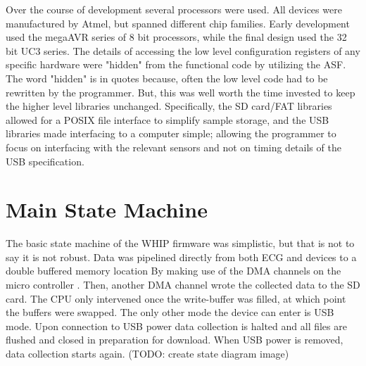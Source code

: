 Over the course of development several processors were used. All devices were manufactured by Atmel, but spanned different chip families. Early development used the megaAVR series of 8 bit processors, while the final design used the 32 bit UC3 series. The details of accessing the low level configuration registers of any specific hardware were "hidden" from the functional code by utilizing the ASF. The word "hidden" is in quotes because, often the low level code had to be rewritten by the programmer. But, this was well worth the time invested to keep the higher level libraries unchanged. Specifically, the SD card/FAT libraries allowed for a POSIX file interface to simplify sample storage, and the USB libraries made interfacing to a computer simple; allowing the programmer to focus on interfacing with the relevant sensors and not on timing details of the USB specification.

\section{Main State Machine}

The basic state machine of the WHIP firmware was simplistic, but that is not to say it is not robust. Data was pipelined directly from both ECG and  devices to a double buffered memory location By making use of the DMA channels on the micro controller . Then, another DMA channel wrote the collected data to the SD card. The CPU only intervened once the write-buffer was filled, at which point the buffers were swapped. The only other mode the device can enter is USB mode. Upon connection to USB power data collection is halted and all files are flushed and closed in preparation for download. When USB power is removed, data collection starts again. (TODO: create state diagram image)


